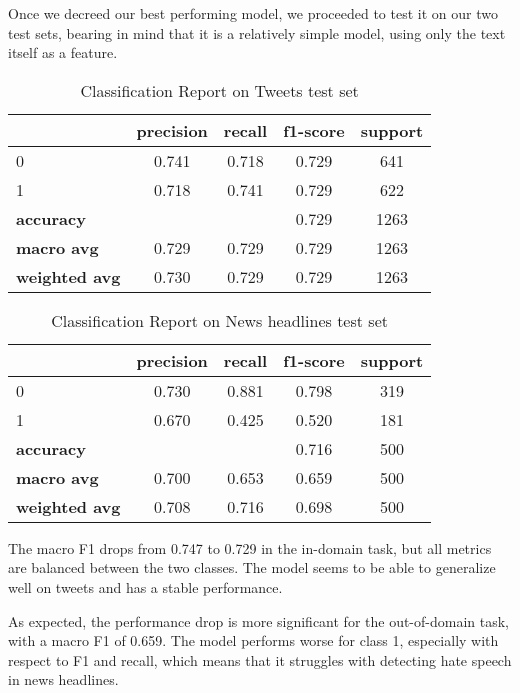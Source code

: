 Once we decreed our best performing model, we proceeded to test it on our two test sets, bearing in mind that it is a relatively simple model, using only the text itself as a feature.

\begin{table}[h]
    \small
    \centering
    \begin{tabular}{lcccc}
        \toprule
        & \textbf{precision} & \textbf{recall} & \textbf{f1-score} & \textbf{support} \\
        \midrule
        0 & 0.741 & 0.718 & 0.729 & 641 \\
        1 & 0.718 & 0.741 & 0.729 & 622 \\
        \midrule
        \textbf{accuracy} & & & 0.729 & 1263 \\
        \textbf{macro avg} & 0.729 & 0.729 & 0.729 & 1263 \\
        \textbf{weighted avg} & 0.730 & 0.729 & 0.729 & 1263 \\
        \bottomrule
    \end{tabular}
    \caption{Classification Report on Tweets test set}
    \label{tab:classification_report_svm_alberto_tweets}
\end{table}

\begin{table}[h]
    \small
    \centering
    \begin{tabular}{lcccc}
        \toprule
        & \textbf{precision} & \textbf{recall} & \textbf{f1-score} & \textbf{support} \\
        \midrule
        0 & 0.730 & 0.881 & 0.798 & 319 \\
        1 & 0.670 & 0.425 & 0.520 & 181 \\
        \midrule
        \textbf{accuracy} & & & 0.716 & 500 \\
        \textbf{macro avg} & 0.700 & 0.653 & 0.659 & 500 \\
        \textbf{weighted avg} & 0.708 & 0.716 & 0.698 & 500 \\
        \bottomrule
    \end{tabular}
    \caption{Classification Report on News headlines test set}
    \label{tab:classification_report_svm_alberto_news}
\end{table}
The macro F1 drops from 0.747 to 0.729 in the in-domain task, but all metrics are balanced between the two classes. The model seems to be able to generalize well on tweets and has a stable performance.

As expected, the performance drop is more significant for the out-of-domain task, with a macro F1 of 0.659. The model performs worse for class 1, especially with respect to F1 and recall, which means that it struggles with detecting hate speech in news headlines.
